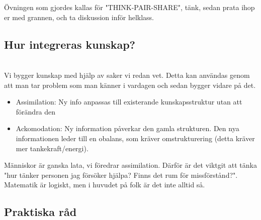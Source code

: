 \noindent Övningen som gjordes kallas för "THINK-PAIR-SHARE", tänk, sedan prata ihop er med grannen, och ta diskussion inför helklass.

\subsection{Hur integreras kunskap?}\hfill\\

\noindent Vi bygger kunskap med hjälp av saker vi redan vet. Detta kan användas genom att man tar problem som man känner i vardagen och sedan bygger vidare på det.

\begin{itemize}
  \item Assimilation: Ny info anpassas till existerande kunskapsstruktur utan att förändra den
  \item Ackomodation: Ny information påverkar den gamla strukturen. Den nya informationen leder till en obalans, som kräver omstrukturering (detta kräver mer tankekraft/energi).
\end{itemize}
\par\bigskip

\noindent Människor är ganska lata, vi föredrar assimilation. Därför är det viktgit att tänka "hur tänker personen jag försöker hjälpa? Finns det rum för missförstånd?". Matematik är logiskt, men i huvudet på folk är det inte alltid så. 

\subsection{Praktiska råd}\hfill\\

